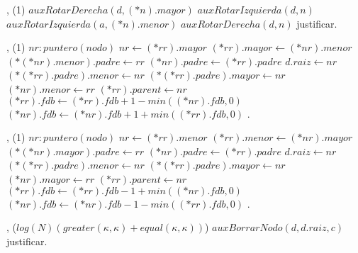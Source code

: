 {   ,
    }
{}
{\bigo(1) \cuidado}
{   
            \State $auxRotarDerecha(d, (*n).mayor)$
        \EndIf
        \State $auxRotarIzquierda(d, n)$
    \Else
            \State $auxRotarIzquierda(a, (*n).menor)$
        \EndIf
        \State $auxRotarDerecha(d, n)$
    \EndIf
}
{   \cuidado justificar. }


{   ,
    }
{}
{\bigo(1) \cuidado}
{   \var $nr : puntero(nodo)$
    \State $nr \gets (*rr).mayor$
    \State $(*rr).mayor \gets (*nr).menor$
        \State $(*(*nr).menor).padre \gets rr$
    \EndIf
    \State $(*nr).padre \gets (*rr).padre$
        \State $d.raiz \gets nr$
    \Else
            \State $(*(*rr).padre).menor \gets nr$
        \Else
            \State $(*(*rr).padre).mayor \gets nr$
        \EndIf
    \EndIf
    \State $(*nr).menor \gets rr$
    \State $(*rr).parent \gets nr$
    \State $(*rr).fdb \gets (*rr).fdb + 1 - min((*nr).fdb, 0)$
    \State $(*nr).fdb \gets (*nr).fdb + 1 + min((*rr).fdb, 0)$
}
{   . }

{   ,
    }
{}
{\bigo(1) \cuidado}
{   \var $nr : puntero(nodo)$
    \State $nr \gets (*rr).menor$
    \State $(*rr).menor \gets (*nr).mayor$
        \State $(*(*nr).mayor).padre \gets rr$
    \EndIf
    \State $(*nr).padre \gets (*rr).padre$
        \State $d.raiz \gets nr$
    \Else
            \State $(*(*rr).padre).menor \gets nr$
        \Else
            \State $(*(*rr).padre).mayor \gets nr$
        \EndIf
    \EndIf
    \State $(*nr).mayor \gets rr$
    \State $(*rr).parent \gets nr$
    \State $(*rr).fdb \gets (*rr).fdb - 1 + min((*nr).fdb, 0)$
    \State $(*nr).fdb \gets (*nr).fdb - 1 - min((*rr).fdb, 0)$
}
{   . }

{   ,
    }
{}
{\bigo($log(N)(greater(\kappa, \kappa)+equal(\kappa, \kappa))$)}
{   \State $auxBorrarNodo(d, d.raiz, c)$   
}
{   \cuidado justificar. }


